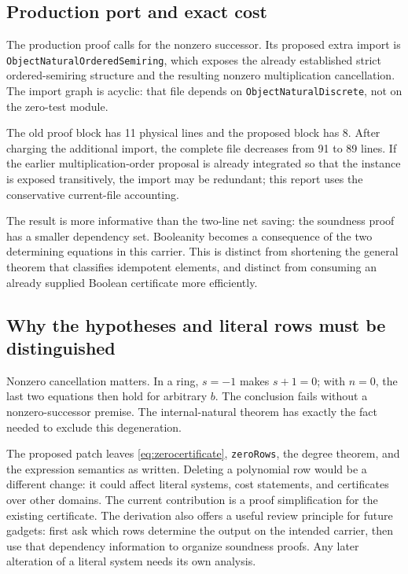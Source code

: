 \documentclass[11pt,letterpaper]{article}
\newcommand{\code}[1]{\nolinkurl{#1}}
\begin{document}
\subsection{Production port and exact cost}

The production proof calls \texttt{} for the nonzero successor. Its proposed extra import is \code{ObjectNaturalOrderedSemiring}, which exposes the already established strict ordered-semiring structure and the resulting nonzero multiplication cancellation. The import graph is acyclic: that file depends on \code{ObjectNaturalDiscrete}, not on the zero-test module.

The old proof block has 11 physical lines and the proposed block has 8. After charging the additional import, the complete file decreases from 91 to 89 lines. If the earlier multiplication-order proposal is already integrated so that the instance is exposed transitively, the import may be redundant; this report uses the conservative current-file accounting.

The result is more informative than the two-line net saving: the soundness proof has a smaller dependency set. Booleanity becomes a consequence of the two determining equations in this carrier. This is distinct from shortening the general theorem that classifies idempotent elements, and distinct from consuming an already supplied Boolean certificate more efficiently.

\subsection{Why the hypotheses and literal rows must be distinguished}

Nonzero cancellation matters. In a ring, $s=-1$ makes $s+1=0$; with $n=0$, the last two equations then hold for arbitrary $b$. The conclusion fails without a nonzero-successor premise. The internal-natural theorem has exactly the fact needed to exclude this degeneration.

The proposed patch leaves \eqref{eq:zerocertificate}, \code{zeroRows}, the degree theorem, and the expression semantics as written. Deleting a polynomial row would be a different change: it could affect literal systems, cost statements, and certificates over other domains. The current contribution is a proof simplification for the existing certificate. The derivation also offers a useful review principle for future gadgets: first ask which rows determine the output on the intended carrier, then use that dependency information to organize soundness proofs. Any later alteration of a literal system needs its own analysis.
\end{document}
